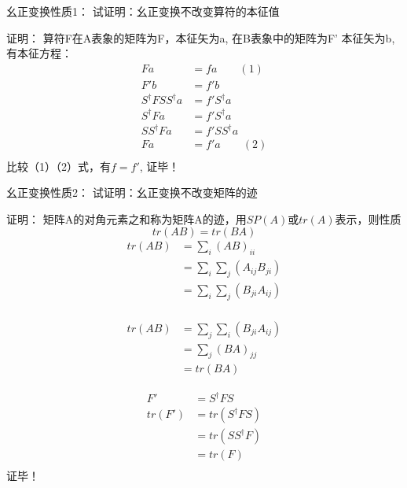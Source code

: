 \begin{frame} 
    \begin{tcolorbox1}{幺正变换性质1：}
        试证明：幺正变换不改变算符的本征值 
    \end{tcolorbox1}
    \alert{证明：}
    算符F在A表象的矩阵为F，本征矢为a, 在B表象中的矩阵为F' 本征矢为b,有本征方程：
    \begin{equation*}
        \begin{split}
            Fa&=fa \qquad (1)\\
            F'b&=f'b\\
            S^{\dagger} F S S^{\dagger}a &=f'S^{\dagger}a\\
            S^{\dagger} F a &=f'S^{\dagger}a\\
            SS^{\dagger} F a &=f'SS^{\dagger}a\\
            F a &=f'a \qquad (2)\\
        \end{split} 
    \end{equation*} 
    比较（1）（2）式，有$f=f'$, 证毕！
\end{frame}    

\begin{frame} 
    \begin{tcolorbox1}{幺正变换性质2：}
        试证明：幺正变换不改变矩阵的迹
    \end{tcolorbox1}
    \alert{证明：} 矩阵A的对角元素之和称为矩阵A的迹，用$SP(A)$或$tr(A)$表示，则性质\\
    $$tr(AB)=tr(BA) $$
    \begin{equation*}
        \begin{split}
            tr(AB) &=\sum_i (AB)_{ii}\\
            &=\sum_{i} \sum_{j} (A_{ij} B_{ji}) \\
            &=\sum_{i} \sum_{j} (B_{ji} A_{ij}) \\
        \end{split} 
    \end{equation*} 
\end{frame}    


\begin{frame}     
    \begin{equation*}
        \begin{split}
            tr(AB) &=\sum_{j} \sum_{i} (B_{ji} A_{ij}) \\
            &=\sum_{j} (BA)_{jj} \\
            &=tr(BA)
        \end{split} 
    \end{equation*}

    \begin{equation*}
        \begin{split}
            F'&= S^{\dagger} F S \\
            tr(F')&=tr(S^{\dagger} F S)\\
            &=tr(SS^{\dagger}  F)\\
            &=tr(F)\\
        \end{split} 
    \end{equation*} 
    证毕！
\end{frame}    

